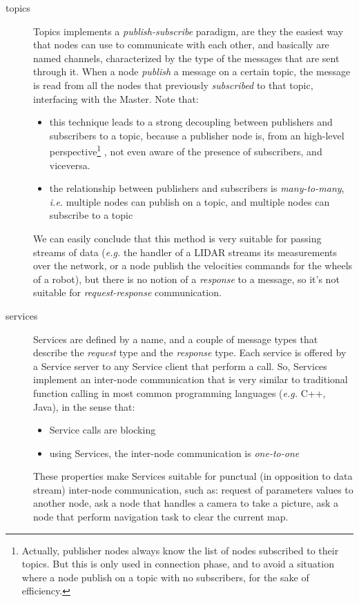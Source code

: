 \begin{description}
\item[topics] Topics implements a \textit{publish-subscribe} paradigm, are they the easiest way that nodes can use to communicate with each other, and basically are named channels, characterized by the type of the messages that are sent through it. When a node \textit{publish} a message on a certain topic, the message is read from all the nodes that previously \textit{subscribed} to that topic, interfacing with the Master. Note that:
\begin{itemize}
	\item this technique leads to a strong decoupling between publishers and subscribers to a topic, because a publisher node is, from an high-level perspective\footnote{Actually, publisher nodes always know the list of nodes subscribed to their topics. But this  is only used in connection phase, and to avoid a situation where a node publish on a topic with no subscribers, for the sake of efficiency.}
	, not even aware of the presence of subscribers, and viceversa.
	\item the relationship between publishers and subscribers is \textit{many-to-many}, \textit{i.e.} multiple nodes can publish on a topic, and multiple nodes can subscribe to a topic
\end{itemize}
We can easily conclude that this method is very suitable for passing streams of data (\textit{e.g.} the handler of a \ac{LIDAR} streams its measurements over the network, or a node publish the velocities commands for the wheels of a robot), but there is no notion of a \textit{response} to a message, so it's not suitable for \textit{request-response} communication.

\item[services] Services are defined by a name, and a couple of message types that describe the \textit{request} type and the \textit{response} type. Each service is offered by a Service server to any Service client that perform a call. So, Services implement an inter-node communication that is very similar to traditional function calling in most common programming languages (\textit{e.g.} C++, Java), in the sense that:
\begin{itemize}
	\item Service calls are blocking
	\item using Services, the inter-node communication is \textit{one-to-one}
\end{itemize}
These properties make Services suitable for punctual (in opposition to data stream) inter-node communication, such as: request of parameters values to another node, ask a node that handles a camera to take a picture, ask a node that perform navigation task to clear the current map.


\end{description}

